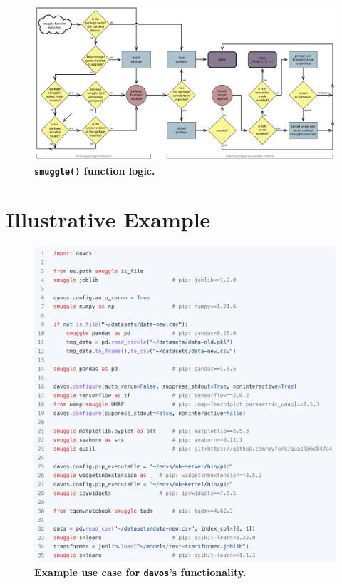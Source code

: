 \documentclass[preprint,12pt,a4paper]{elsarticle}
\begin{document}
\begin{figure}[tp]
\centering
\includegraphics[width=\textwidth]{figs/flow_chart}
\caption{\small \textbf{\texttt{smuggle()} function logic.} }
\label{fig:flow-chart}
\end{figure}



\section{Illustrative Example}\label{sec:illustrative-example}

\begin{figure}[tp]
\centering
\includegraphics[width=\textwidth]{figs/illustrative_example}
\caption{\small \textbf{Example use case for \texttt{davos}'s functionality.}}
\label{fig:illustrative-example}
\end{figure}
\end{document}
